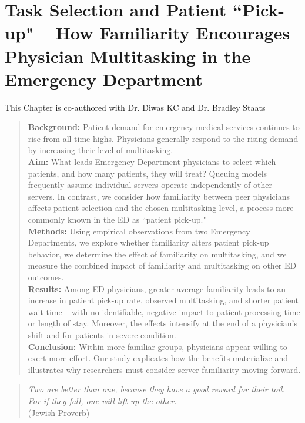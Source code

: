 \chapter{Task Selection and Patient “Pick-up" -- How Familiarity Encourages Physician Multitasking in the Emergency Department} 
This Chapter is co-authored with Dr. Diwas KC and Dr. Bradley Staats

\begin{abstract} 
\noindent
 \textbf{Background:} Patient demand for emergency medical services continues to rise from all-time highs. Physicians generally respond to the rising demand by increasing their level of multitasking. \\
 \textbf{Aim:} What leads Emergency Department physicians to select which patients, and how many patients, they will treat? Queuing models frequently assume individual servers operate independently of other servers. In contrast, we consider how familiarity between peer physicians affects patient selection and the chosen multitasking level, a process more commonly known in the ED as “patient pick-up." \\
 \textbf{Methods:} Using empirical observations from two Emergency Departments, we explore whether familiarity alters patient pick-up behavior, we determine the effect of familiarity on multitasking, and we measure the combined impact of familiarity and multitasking on other ED outcomes. \\
 \textbf{Results:} Among ED physicians, greater average familiarity leads to an increase in patient pick-up rate, observed multitasking, and shorter patient wait time -- with no identifiable, negative impact to patient processing time or length of stay. Moreover, the effects intensify at the end of a physician’s shift and for patients in severe condition. \\ 
 \textbf{Conclusion:} Within more familiar groups, physicians appear willing to exert more effort. Our study explicates how the benefits materialize and illustrates why researchers must consider server familiarity moving forward. \\
\end{abstract}



\begin{quote}
    \textit{Two are better than one, because they have a good reward for their toil. \\
    For if they fall, one will lift up the other.} \\
    (Jewish Proverb) %
\end{quote}

